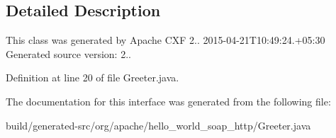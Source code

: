 \subsection{Detailed Description}
This class was generated by Apache C\+X\+F 2.. 2015-\/04-\/21\+T10\+:49\+:24.+05\+:30 Generated source version\+: 2.. 

Definition at line 20 of file Greeter.\+java.



The documentation for this interface was generated from the following file\+:\begin{DoxyCompactItemize}
\item 
build/generated-\/src/org/apache/hello\+\_\+world\+\_\+soap\+\_\+http/Greeter.\+java\end{DoxyCompactItemize}
